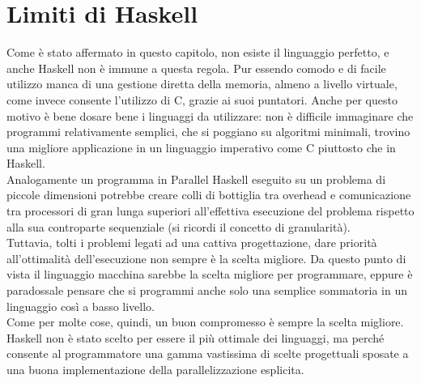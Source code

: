 \section{Limiti di Haskell}
Come è stato affermato in questo capitolo, non esiste il linguaggio perfetto, e anche Haskell non è immune a questa regola. Pur essendo comodo e di facile utilizzo manca di una gestione diretta della memoria, almeno a livello virtuale, come invece consente l'utilizzo di C, grazie ai suoi puntatori. Anche per questo motivo è bene dosare bene i linguaggi da utilizzare: non è difficile immaginare che programmi relativamente semplici, che si poggiano su algoritmi minimali, trovino una migliore applicazione in un linguaggio imperativo come C piuttosto che in Haskell.\\
Analogamente un programma in Parallel Haskell eseguito su un problema di piccole dimensioni potrebbe creare colli di bottiglia tra overhead e comunicazione tra processori di gran lunga superiori all'effettiva esecuzione del problema rispetto alla sua controparte sequenziale (si ricordi il concetto di granularità).\\
Tuttavia, tolti i problemi legati ad una cattiva progettazione, dare priorità all'ottimalità dell'esecuzione non sempre è la scelta migliore. Da questo punto di vista il linguaggio macchina sarebbe la scelta migliore per programmare, eppure è paradossale pensare che si programmi anche solo una semplice sommatoria in un linguaggio così a basso livello.\\
Come per molte cose, quindi, un buon compromesso è sempre la scelta migliore. Haskell non è stato scelto per essere il più ottimale dei linguaggi, ma perché consente al programmatore una gamma vastissima di scelte progettuali sposate a una buona implementazione della parallelizzazione esplicita.

